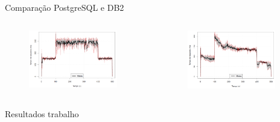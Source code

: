 
\begin{frame}{Comparação PostgreSQL e DB2}
	\begin{columns}
		\begin{column}{0.5\textwidth}
			\begin{figure}
				\centering
				\includegraphics[width=0.9\textwidth]{images/tempo-resposta-postgres-crop.png}
			\end{figure}
			
		\end{column}
		
		\begin{column}{0.5\textwidth}
				\begin{figure}
					\centering
					\includegraphics[width=0.9\textwidth]{images/tempo-resposta-db2-crop.png}
				\end{figure}
			
		\end{column}
	\end{columns}
	
	\caption{Resultados trabalho \cite{Edwin2015}}
\end{frame}


